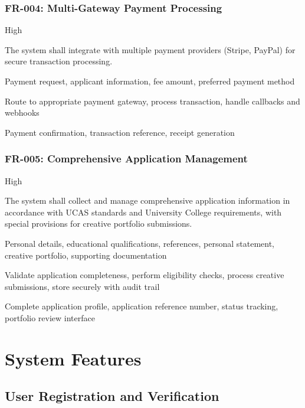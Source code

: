 \documentclass[11pt]{article}
\newenvironment{frdescription}{%
  \begin{description}[font=\normalfont\sffamily\bfseries, labelwidth=2cm, leftmargin=2.2cm]%
}{%
  \end{description}%
}
\begin{document}
\subsubsection{FR-004: Multi-Gateway Payment Processing}
\begin{frdescription}
    \item[Priority] High
    \item[Description] The system shall integrate with multiple payment providers (Stripe, PayPal) for secure transaction processing.
    \item[Inputs] Payment request, applicant information, fee amount, preferred payment method
    \item[Processing] Route to appropriate payment gateway, process transaction, handle callbacks and webhooks
    \item[Outputs] Payment confirmation, transaction reference, receipt generation
\end{frdescription}

\subsubsection{FR-005: Comprehensive Application Management}
\begin{frdescription}
    \item[Priority] High
    \item[Description] The system shall collect and manage comprehensive application information in accordance with UCAS standards and University College requirements, with special provisions for creative portfolio submissions.
    \item[Inputs] Personal details, educational qualifications, references, personal statement, creative portfolio, supporting documentation
    \item[Processing] Validate application completeness, perform eligibility checks, process creative submissions, store securely with audit trail
    \item[Outputs] Complete application profile, application reference number, status tracking, portfolio review interface
\end{frdescription}

\section{System Features}

\subsection{User Registration and Verification}
\end{document}
